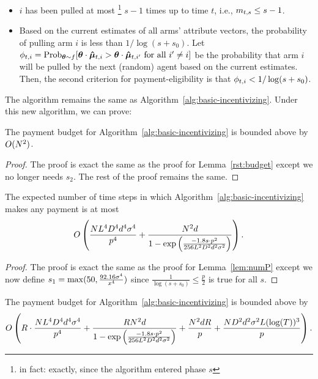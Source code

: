 \begin{itemize}
\item $i$ has been pulled at most%
\footnote{in fact: exactly, since the algorithm entered phase $s$}
$s-1$ times up to time $t$, i.e., $m_{t,s} \leq s-1$.
\item Based on the current estimates  of all arms'
attribute vectors, the probability of pulling arm $i$ is less than $1/\log(s+s_0)$. Let $\PullProb{t}{i} = \Prob[\AgV \sim \AgentDist]{\AgV \cdot \ArmEV{t}{i} > \AgV
  \cdot \ArmEV{t}{i'} \mbox{ for all } i' \neq i}$
be the probability that arm $i$ will be pulled
by the next (random) agent based on the current estimates. 
Then, the second criterion for payment-eligibility is that
$\phi_{t,i} < 1/\log(s+s_0)$.
\end{itemize}

The algorithm remains the same as Algorithm~\ref{alg:basic-incentivizing}. Under this new algorithm, we can prove:

\begin{theorem}
The payment budget for Algorithm~\ref{alg:basic-incentivizing} is bounded above by $O(N^2)$. 
\end{theorem}

\begin{proof}
The proof is exact the same as the proof for Lemma~\ref{rst:budget} except we no longer needs $s_2$. The rest of the proof remains the same.
\end{proof}

\begin{lemma}  \label{lem:NumP2}
The expected number of time steps in which
Algorithm~\ref{alg:basic-incentivizing}
makes any payment is at most 
\begin{align}
O\left(\frac{N L^4 D^4 d^4 \sigma^4}{p^4}
  + \frac{N^2 d}{1 - \exp \left(
    \frac{-1.8 s \cdot p^2}{256 L^2 D^2 d^2 \sigma^2}
  \right)} \right). \nonumber 
\end{align}
\end{lemma}

\begin{proof}
The proof is exact the same as the proof for Lemma~\ref{lem:numP} except we now define $s_1 = \max(50, \frac{92.16 \sigma^4}{x^4})$ since $\frac{1}{\log(s+s_0)}\leq \frac{p}{2}$ is true for all $s$.
\end{proof}

\begin{theorem}
The payment budget for Algorithm~\ref{alg:basic-incentivizing} is bounded above by 
\begin{align}
O \left(R\cdot \frac{N L^4 D^4 d^4 \sigma^4}{p^4}
  + \frac{R N^2 d}{1 - \exp \left(
    \frac{-1.8 s \cdot p^2}{256 L^2 D^2 d^2 \sigma^2}
  \right)} +\frac{N^2 dR}{p}+\frac{ND^2 d^2\sigma^2 L(\log(T))^3}{p}\right).  \nonumber
\end{align}
\end{theorem}

